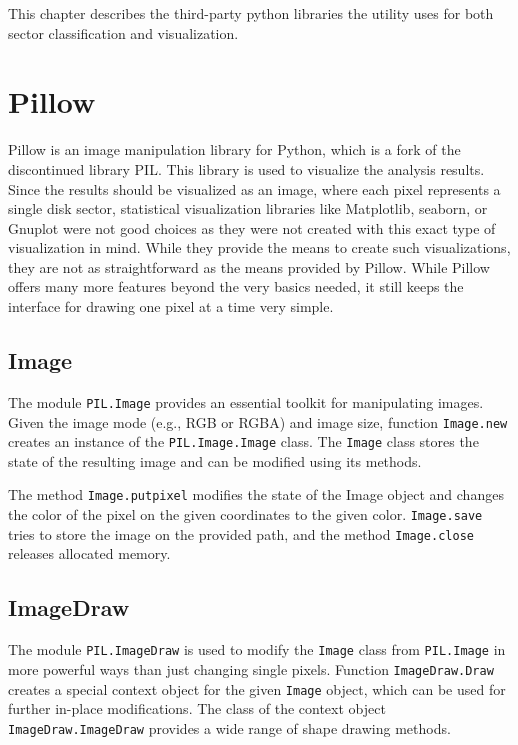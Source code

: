 \documentclass[
  digital, %
  color,   %
  oneside, %
  lof,     %
  nolot,     %
]{fithesis4}
\begin{document}
This chapter describes the third-party python libraries the utility uses for both sector classification and visualization.

\section{Pillow}
\label{sec:pillow}

Pillow\cite{pillow} is an image manipulation library for Python, which is a fork of the discontinued library PIL\cite{pil}.
This library is used to visualize the analysis results.
Since the results should be visualized as an image, where each pixel represents a single disk sector, statistical visualization libraries like Matplotlib\cite{matplotlib}, seaborn\cite{waskom21}, or Gnuplot\cite{gnuplot} were not good choices as they were not created with this exact type of visualization in mind.
While they provide the means to create such visualizations, they are not as straightforward as the means provided by Pillow.
While Pillow offers many more features beyond the very basics needed, it still keeps the interface for drawing one pixel at a time very simple. 

\subsection{Image}
\label{ssec:image}

The module \texttt{PIL.Image} provides an essential toolkit for manipulating images.
Given the image mode (e.g., RGB or RGBA) and image size, function \texttt{Image.new} creates an instance of the \texttt{PIL.Image.Image} class.
The \texttt{Image} class stores the state of the resulting image and can be modified using its methods. 

The method \texttt{Image.putpixel} modifies the state of the Image object and changes the color of the pixel on the given coordinates to the given color.
\texttt{Image.save} tries to store the image on the provided path, and the method \texttt{Image.close} releases allocated memory.\cite{pillowimage}

\subsection{ImageDraw}
\label{ssec:imagedraw}

The module \texttt{PIL.ImageDraw} is used to modify the \texttt{Image} class from \texttt{PIL.Image} in more powerful ways than just changing single pixels.
Function \texttt{ImageDraw.Draw} creates a special context object for the given \texttt{Image} object, which can be used for further in-place modifications.
The class of the context object \texttt{ImageDraw.ImageDraw} provides a wide range of shape drawing methods.
\end{document}
